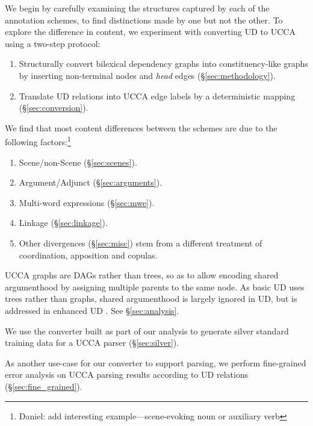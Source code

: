 \documentclass[11pt,a4paper]{article}
\newcommand{\daniel}[1]{\footnote{\color{blue}Daniel: #1}}
\begin{document}
We begin by carefully examining the structures captured by each of the annotation schemes,
to find distinctions made by one but not the other.
To explore the difference in content, we experiment with converting UD to UCCA
using a two-step protocol:
\begin{enumerate}
\item Structurally convert bilexical dependency graphs into constituency-like graphs by inserting
  non-terminal nodes and \textit{head} edges (\S\ref{sec:methodology}).
\item Translate UD relations into UCCA edge labels
  by a deterministic mapping (\S\ref{sec:conversion}).
\end{enumerate}
  
   We find that most content differences between the schemes are due to the following
   factors:\daniel{add interesting example---scene-evoking noun or auxiliary verb}

  \begin{enumerate}[noitemsep]
    \item Scene/non-Scene (\S\ref{sec:scenes}).
    \item Argument/Adjunct (\S\ref{sec:arguments}).
    \item Multi-word expressions (\S\ref{sec:mwe}).
    \item Linkage (\S\ref{sec:linkage}).
    \item Other divergences (\S\ref{sec:misc})
    stem from a different treatment of coordination, apposition and copulas.
     \end{enumerate}

   UCCA graphs are DAGs rather than trees, so as to allow encoding shared argumenthood
   by assigning multiple parents to the same node.
   As basic UD uses trees rather than graphs, shared argumenthood is largely ignored in UD,
   but is addressed in enhanced UD \cite{SCHUSTER16.779}.
  See \S\ref{sec:analysis}.

  We use the converter built as part of our analysis to generate silver standard
  training data for a UCCA parser (\S\ref{sec:silver}).
  
  As another use-case for our converter to support parsing,
  we perform fine-grained error analysis on UCCA parsing results
  according to UD relations (\S\ref{sec:fine_grained}).

\end{document}

